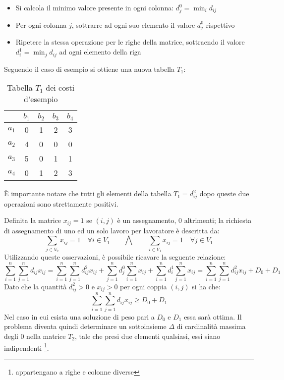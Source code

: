 \documentclass[../template]{subfiles}
\begin{document}
\begin{itemize}
    \item Si calcola il minimo valore presente in ogni colonna: $d^0_j = \min_i d_{ij}$
    \item Per ogni colonna $j$, sottrarre ad ogni suo elemento il valore $d^0_j$ rispettivo
    \item Ripetere la stessa operazione per le righe della matrice, sottraendo il valore $d^1_i = \min_j d_{ij}$ ad ogni
        elemento della riga
\end{itemize}
Seguendo il caso di esempio si ottiene una nuova tabella $T_1$:

\begin{table}[h]
    \centering
    \begin{tabular}{|c|cccc|}
        \hline
    & $b_1$ & $b_2$ & $b_3$ & $b_4$\\
    \hline
        $a_1$ & 0 & 1 & 2 & 3\\
        $a_2$ & 4 & 0 & 0 & 0\\
        $a_3$ & 5 & 0 & 1 & 1\\
        $a_4$ & 0 & 1 & 2 & 3\\
        \hline
    \end{tabular}
    \caption{Tabella $T_1$ dei costi d'esempio}
    \label{tab:hungarian_example_t1}
\end{table}


È importante notare che tutti gli elementi della tabella $T_1 = d_{ij}^2$ dopo queste due operazioni sono strettamente positivi.

Definita la matrice $x_{ij} = 1$ se $(i, j)$ è un assegnamento, 0 altrimenti; la richiesta di assegnamento di uno ed un
solo lavoro per lavoratore è descritta da:
\[
    \sum_{j \in V_2} x_{ij} = 1 \quad \forall i \in V_1 \qquad
    \bigwedge\qquad
    \sum_{i \in V_1} x_{ij} = 1 \quad \forall j \in V_1
\]
Utilizzando queste osservazioni, è possibile ricavare la seguente relazione:
\[
    \sum^n_{i = 1} \sum^n_{j=1} d_{ij} x_{ij} =
    \sum^n_{i=1}\sum^n_{j=1} d_{ij}^2 x_{ij} + \sum_{j=1}^n d_j^0 \sum_{i=1}^n x_{ij}+ \sum^n_{i=1} d_i^1\sum^n_{j=1} x_{ij} =
    \sum^n_{i=1}\sum^n_{j=1} d_{ij}^2 x_{ij} + D_0 + D_1
\]
Dato che la quantità $d_{ij}^2 > 0$ e $x_{ij} > 0$ per ogni coppia $(i, j)$ si ha che:
\[
    \sum^n_{i=1}\sum^n_{j=1} d_{ij} x_{ij}  \ge D_0 + D_1
\]
Nel caso in cui esista una soluzione di peso pari a $D_0$ e $D_1$ essa sarà ottima.
Il problema diventa quindi determinare un sottoinsieme $\Delta$ di cardinalità massima degli 0 nella matrice $T_2$, tale
che presi due elementi qualsiasi, essi siano indipendenti \footnote{appartengano a righe e colonne diverse}.
\end{document}
